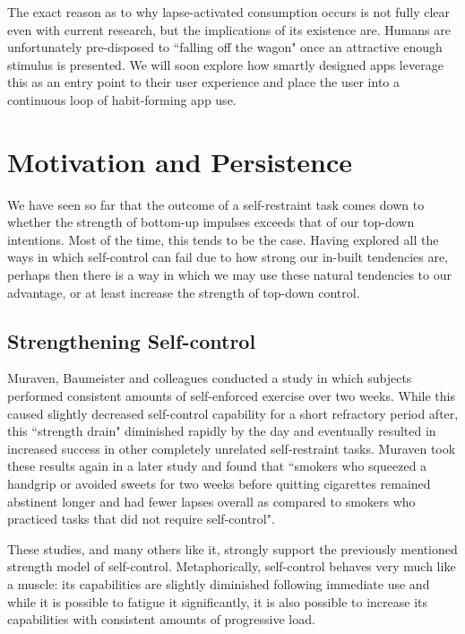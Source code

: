The exact reason as to why lapse-activated consumption occurs is not fully clear even with current research, but the implications of its existence are. Humans are unfortunately pre-disposed to ``falling off the wagon" once an attractive enough stimulus is presented. We will soon explore how smartly designed apps leverage this as an entry point to their user experience and place the user into a continuous loop of habit-forming app use.

\section{Motivation and Persistence}
We have seen so far that the outcome of a self-restraint task comes down to whether the strength of bottom-up impulses exceeds that of our top-down intentions. Most of the time, this tends to be the case. Having explored all the ways in which self-control can fail due to how strong our in-built tendencies are, perhaps then there is a way in which we may use these natural tendencies to our advantage, or at least increase the strength of top-down control.

\subsection{Strengthening Self-control}
Muraven, Baumeister and colleagues \cite{muraven1999longitudinal} conducted a study in which subjects performed consistent amounts of self-enforced exercise over two weeks. While this caused slightly decreased self-control capability for a short refractory period after, this ``strength drain" diminished rapidly by the day and eventually resulted in increased success in other completely unrelated self-restraint tasks. Muraven \cite{muraven2010practicing} took these results again in a later study and found that ``smokers who squeezed a handgrip or avoided sweets for two weeks before quitting cigarettes remained abstinent longer and had fewer lapses overall as compared to smokers who practiced tasks that did not require self-control".

These studies, and many others like it, strongly support the previously mentioned strength model of self-control. Metaphorically, self-control behaves very much like a muscle: its capabilities are slightly diminished following immediate use and while it is possible to fatigue it significantly, it is also possible to increase its capabilities with consistent amounts of progressive load.

